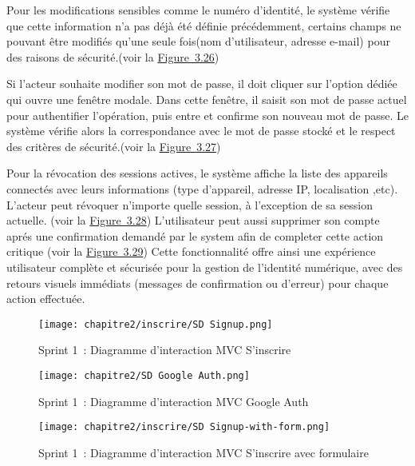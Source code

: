 \hspace{1em}Pour les modifications sensibles comme le numéro d'identité, le système vérifie que cette information n'a pas déjà été définie précédemment, certains champs ne pouvant être modifiés qu'une seule fois(nom d'utilisateur, adresse e-mail) pour des raisons de sécurité.(voir la \hyperref[fig:3.26]{Figure~3.26})

\hspace{1em}Si l'acteur souhaite modifier son mot de passe, il doit cliquer sur l'option dédiée qui ouvre une fenêtre modale. Dans cette fenêtre, il saisit son mot de passe actuel pour authentifier l'opération, puis entre et confirme son nouveau mot de passe. Le système vérifie alors la correspondance avec le mot de passe stocké et le respect des critères de sécurité.(voir la \hyperref[fig:3.27]{Figure~3.27})

\hspace{1em}Pour la révocation des sessions actives, le système affiche la liste des appareils connectés avec leurs informations (type d'appareil, adresse IP, localisation ,etc). L'acteur peut révoquer n'importe quelle session, à l'exception de sa session actuelle.
(voir la \hyperref[fig:3.28]{Figure~3.28})
\hspace{1em}L'utilisateur peut aussi supprimer son compte aprés une confirmation demandé par le system afin de completer cette action critique
(voir la \hyperref[fig:3.29]{Figure~3.29})
\hspace{1em}Cette fonctionnalité offre ainsi une expérience utilisateur complète et sécurisée pour la gestion de l'identité numérique, avec des retours visuels immédiats (messages de confirmation ou d'erreur) pour chaque action effectuée.

\begin{figure}[H]
  \centering
  \texttt{[image: chapitre2/inscrire/SD Signup.png]}
  \caption{Sprint 1~: Diagramme d'interaction MVC \og S'inscrire \fg{}}
  \label{fig:3.9}
\end{figure}
\begin{figure}[H]
  \centering
  \texttt{[image: chapitre2/SD Google Auth.png]}
  \caption{Sprint 1~: Diagramme d'interaction MVC \og Google Auth \fg{}}
  \label{fig:3.7}
\end{figure}
\vspace{-10pt}
\begin{figure}[H]
  \centering
  \texttt{[image: chapitre2/inscrire/SD Signup-with-form.png]}
  \caption{Sprint 1~: Diagramme d'interaction MVC \og S'inscrire avec formulaire \fg{}}
  \label{fig:3.8}
\end{figure}


